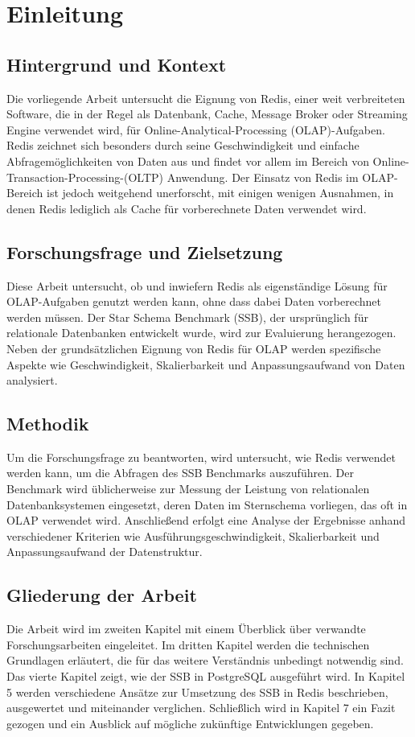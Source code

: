 \chapter{Einleitung}


\section{Hintergrund und Kontext}
Die vorliegende Arbeit untersucht die Eignung von Redis, einer weit verbreiteten Software, die in der Regel als Datenbank, Cache, Message Broker oder Streaming Engine verwendet wird, für Online-Analytical-Processing (OLAP)-Aufgaben. Redis zeichnet sich besonders durch seine Geschwindigkeit und einfache Abfragemöglichkeiten von Daten aus und findet vor allem im Bereich von Online-Transaction-Processing-(OLTP) Anwendung. Der Einsatz von Redis im OLAP-Bereich ist jedoch weitgehend unerforscht, mit einigen wenigen Ausnahmen, in denen Redis lediglich als Cache für vorberechnete Daten verwendet wird.

\section{Forschungsfrage und Zielsetzung}
Diese Arbeit untersucht, ob und inwiefern Redis als eigenständige Lösung für OLAP-Aufgaben genutzt werden kann, ohne dass dabei Daten vorberechnet werden müssen. Der Star Schema Benchmark (SSB), der ursprünglich für relationale Datenbanken entwickelt wurde, wird zur Evaluierung herangezogen. Neben der grundsätzlichen Eignung von Redis für OLAP werden spezifische Aspekte wie Geschwindigkeit, Skalierbarkeit und Anpassungsaufwand von Daten analysiert.

\section{Methodik}
Um die Forschungsfrage zu beantworten, wird untersucht, wie Redis verwendet werden kann, um die Abfragen des SSB Benchmarks auszuführen. Der Benchmark wird üblicherweise zur Messung der Leistung von relationalen Datenbanksystemen eingesetzt, deren Daten im Sternschema vorliegen, das oft in OLAP verwendet wird.
Anschließend erfolgt eine Analyse der Ergebnisse anhand verschiedener Kriterien wie Ausführungsgeschwindigkeit, Skalierbarkeit und Anpassungsaufwand der Datenstruktur.


\section{Gliederung der Arbeit}
Die Arbeit wird im zweiten Kapitel mit einem Überblick über verwandte Forschungsarbeiten eingeleitet.
Im dritten Kapitel werden die technischen Grundlagen erläutert, die für das weitere Verständnis unbedingt notwendig sind.
Das vierte Kapitel zeigt, wie der \acf{SSB} in PostgreSQL ausgeführt wird.
In Kapitel 5 werden verschiedene Ansätze zur Umsetzung des \ac{SSB} in Redis beschrieben, ausgewertet und miteinander verglichen.
Schließlich wird in Kapitel 7 ein Fazit gezogen und ein Ausblick auf mögliche zukünftige Entwicklungen gegeben.

 